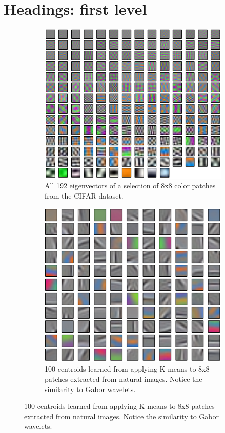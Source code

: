 \documentclass{article} %
\begin{document}
\section{Headings: first level}
\label{headings}

\begin{figure}
  \centering
  \begin{subfigure}[h]{0.45\columnwidth}
    \includegraphics[width=\columnwidth]{./images/eigs192.png}
    \caption{All 192 eigenvectors of a selection of 8x8 color patches from the CIFAR dataset.}
    \label{figEigenvectors}
  \end{subfigure}
  \hspace{0.04\columnwidth}
  \centering
  \begin{subfigure}[h]{0.45\columnwidth}
    \includegraphics[width=\columnwidth]{./images/patches100.png}
    \caption{100 centroids learned from applying K-means to 8x8 patches extracted from natural images. Notice the similarity to Gabor wavelets.}
    \label{fig_centroids}
  \end{subfigure}
\end{figure}
\end{document}
